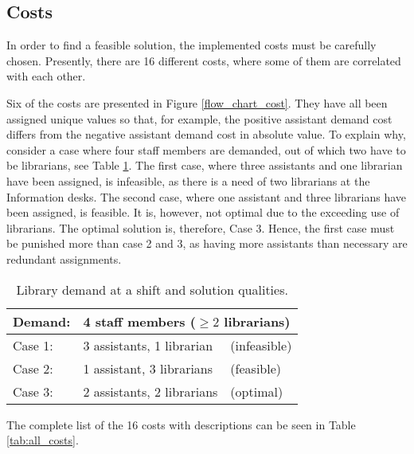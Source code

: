     


\subsection{Costs} \label{cost_section}
In order to find a feasible solution, the implemented costs must be carefully chosen. Presently, there are 16 different costs, where some of them are correlated with each other.

Six of the costs are presented in Figure \ref{flow_chart_cost}. They have all been assigned unique values so that, for example, the positive assistant demand cost differs from the negative assistant demand cost in absolute value. To explain why, consider a case where four staff members are demanded, out of which two have to be librarians, see Table \ref{library_solutions}. The first case, where three assistants and one librarian have been assigned, is infeasible, as there is a need of two librarians at the Information desks. The second case, where one assistant and three librarians have been assigned, is feasible. It is, however, not optimal due to the exceeding use of librarians. The optimal solution is, therefore, Case 3. Hence, the first case must be punished more than case 2 and 3, as having more assistants than necessary are redundant assignments.

\begin{table}[!h]
\centering
\caption{Library demand at a shift and solution qualities.}
\label{library_solutions}
\begin{tabular}{|l|l|l|}
\hline
\rowcolor[HTML]{C0C0C0} 
Demand:                         & \multicolumn{2}{l|}{\cellcolor[HTML]{C0C0C0}4 staff members ($\geq 2$ librarians)} \\ \hline
\rowcolor[HTML]{FD6864} 
\cellcolor[HTML]{C0C0C0}Case 1: & 3 assistants, 1 librarian                  & (infeasible)                 \\ \hline
\rowcolor[HTML]{FFFE65} 
\cellcolor[HTML]{C0C0C0}Case 2: & 1 assistant, 3 librarians                  & (feasible)                     \\ \hline
\rowcolor[HTML]{34FF34} 
\cellcolor[HTML]{C0C0C0}Case 3:  & 2 assistants, 2 librarians                 & (optimal)                      \\ \hline
\end{tabular}
\end{table}

The complete list of the 16 costs with descriptions can be seen in Table \ref{tab:all_costs}. 

